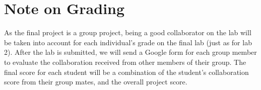 \documentclass[letterpaper,12pt]{article}
\begin{document}



\section{Note on Grading}
As the final project is a group project, being a good collaborator on the lab will be taken into account for each individual’s grade on the final lab (just as for lab 2). After the lab is submitted, we will send a Google form for each group member to evaluate the collaboration received from other members of their group. The final score for each student will be a combination of the student’s collaboration score from their group mates, and the overall project score.\\


\printbibliography
\end{document}
